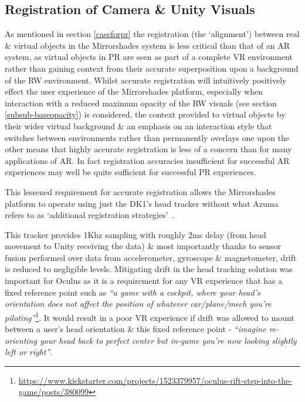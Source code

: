 
\subsection{Registration of Camera \& Unity Visuals}

As mentioned in section \ref{caseforpr} the registration (the `alignment') between real \& virtual objects in the Mirrorshades system is less critical than that of an AR system, as virtual objects in PR are seen as part of a complete VR environment rather than gaining context from their accurate superposition upon a background of the RW environment. Whilst accurate registration will intuitively positively effect the user experience of the Mirrorshades platform, especially when interaction with a reduced maximum opacity of the RW visuals (see section \ref{subsub-baseopacity}) is considered, the context provided to virtual objects by their wider virtual background \& an emphasis on an interaction style that switches between environments rather than permanently overlays one upon the other means that highly accurate registration is less of a concern than for many applications of AR. In fact registration accuracies insufficient for successful AR experiences may well be quite sufficient for successful PR experiences.

This lessened requirement for accurate registration allows the Mirrorshades platform to operate using just the DK1's head tracker without what Azuma refers to as `additional registration strategies'~\cite{Azuma1997}.

This tracker provides 1Khz sampling with roughly 2ms delay (from head movement to Unity receiving the data) \& most importantly thanks to sensor fusion performed over data from accelerometer, gyroscope \& magnetometer, drift is reduced to negligible levels. Mitigating drift in the head tracking solution was important for Oculus as it is a requirement for any VR experience that has a fixed reference point such as \textit{``a game with a cockpit, where your head’s orientation does not affect the position of whatever car/plane/mech you’re piloting''}\footnote{\url{https://www.kickstarter.com/projects/1523379957/oculus-rift-step-into-the-game/posts/380099}}\saveFN\rifttrackerfn. It would result in a poor VR experience if drift was allowed to mount between a user's head orientation \& this fixed reference point - \textit{``imagine re-orienting your head back to perfect center but in-game you're now looking slightly left or right''}\useFN\rifttrackerfn.


